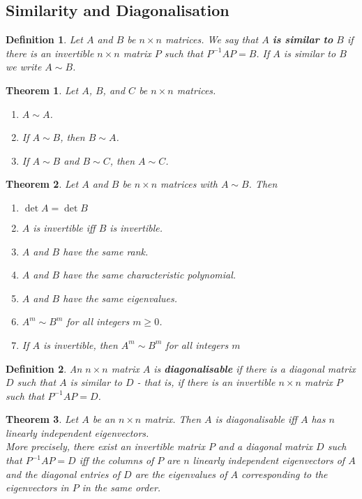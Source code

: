 \documentclass{article}
\theoremstyle{sltheorem}
\newtheorem{definition}{Definition}[section]
\newtheorem{theorem}{Theorem}[section]
\begin{document}
\subsection{Similarity and Diagonalisation}
\begin{definition}
    Let $A$ and $B$ be $n\times n$ matrices. We say that $A$ \textbf{is similar to} $B$ if there is an invertible $n\times n$ matrix $P$ such that $P^{-1}AP=B$. If $A$ is similar to $B$ we write $A\sim B$.
\end{definition}
\begin{theorem}
    Let $A$, $B$, and $C$ be $n\times n$ matrices.
    \begin{enumerate}
        \item $A\sim A$.
        \item If $A\sim B$, then $B\sim A$.
        \item If $A\sim B$ and $B\sim C$, then $A\sim C$.
    \end{enumerate}
\end{theorem}
\begin{theorem}
    Let $A$ and $B$ be $n\times n$ matrices with $A\sim B$. Then
    \begin{enumerate}
        \item $\det A = \det B$
        \item $A$ is invertible iff $B$ is invertible.
        \item $A$ and $B$ have the same rank.
        \item $A$ and $B$ have the same characteristic polynomial.
        \item $A$ and $B$ have the same eigenvalues.
        \item $A^m\sim B^m$ for all integers $m\geq 0$.
        \item If $A$ is invertible, then $A^m\sim B^m$ for all integers $m$
    \end{enumerate}
\end{theorem}
\begin{definition}
    An $n\times n$ matrix $A$ is \textbf{diagonalisable} if there is a diagonal matrix $D$ such that $A$ is similar to $D$ - that is, if there is an invertible $n\times n$ matrix $P$ such that $P^{-1}AP = D$.
\end{definition}
\begin{theorem}
    Let $A$ be an $n\times n$ matrix. Then $A$ is diagonalisable iff $A$ has $n$ linearly independent eigenvectors.\\
    More precisely, there exist an invertible matrix $P$ and a diagonal matrix $D$ such that $P^{-1}AP=D$ iff the columns of $P$ are $n$ linearly independent eigenvectors of $A$ and the diagonal entries of $D$ are the eigenvalues of $A$ corresponding to the eigenvectors in $P$ in the same order.
\end{theorem}
\end{document}
